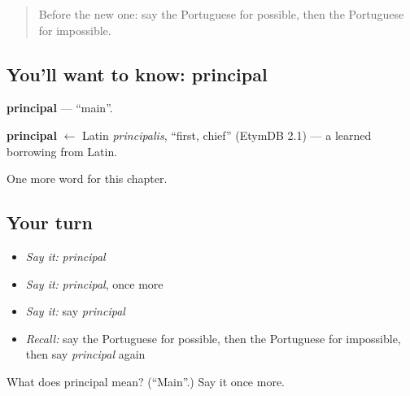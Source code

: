\begin{quote}
Before the new one: say the Portuguese for possible, then the Portuguese for impossible.
\end{quote}

\subsection*{You'll want to know: principal}
\textbf{principal} — \textquotedblleft{}main\textquotedblright{}.

\begin{cousinweb}
\textbf{principal} $\leftarrow$ Latin \emph{principalis}, \textquotedblleft{}first, chief\textquotedblright{} (EtymDB 2.1) — a learned borrowing from Latin.
\end{cousinweb}

\begin{grammarlens}[title={What you've built}]
One more word for this chapter.
\end{grammarlens}

\subsection*{Your turn}
\begin{itemize}
\raggedright
  \item \emph{Say it:} \emph{principal}
  \item \emph{Say it:} \emph{principal}, once more
  \item \emph{Say it:} say \emph{principal}
  \item \emph{Recall:} say the Portuguese for possible, then the Portuguese for impossible, then say \emph{principal} again
\end{itemize}

\begin{tcolorbox}[breakable,colback=teal!4,colframe=teal!35!black,title={Before you move on}]
What does principal mean? (\textquotedblleft{}Main\textquotedblright{}.) Say it once more.
\end{tcolorbox}
